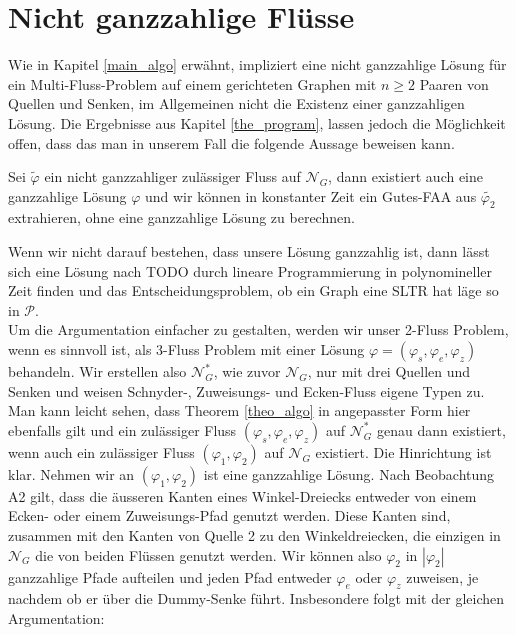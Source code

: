 \chapter{Nicht ganzzahlige Flüsse}

Wie in Kapitel \ref{main_algo} erwähnt, impliziert eine nicht ganzzahlige Lösung für ein Multi-Fluss-Problem auf einem gerichteten Graphen mit $n\geq 2$ Paaren von Quellen und Senken, im Allgemeinen nicht die Existenz einer ganzzahligen Lösung. Die Ergebnisse aus Kapitel \ref{the_program}, lassen jedoch die Möglichkeit offen, dass das man in unserem Fall die folgende Aussage beweisen kann.

\begin{conjecture}\label{int_conj}
Sei $\tilde{\varphi}$ ein nicht ganzzahliger zulässiger Fluss auf $\mathcal{N}_G$, dann existiert auch eine ganzzahlige Lösung $\varphi$ und wir können in konstanter Zeit ein Gutes-FAA aus $\tilde{\varphi_2}$ extrahieren, ohne eine ganzzahlige Lösung zu berechnen.
\end{conjecture}

Wenn wir nicht darauf bestehen, dass unsere Lösung ganzzahlig ist, dann lässt sich eine Lösung nach TODO durch lineare Programmierung in polynomineller Zeit finden und das Entscheidungsproblem, ob ein Graph eine SLTR hat läge so in $\mathcal{P}$. \\

Um die Argumentation einfacher zu gestalten, werden wir unser 2-Fluss Problem, wenn es sinnvoll ist, als 3-Fluss Problem mit einer Lösung $\varphi=(\varphi_s,\varphi_e,\varphi_z)$ behandeln. Wir erstellen also $\mathcal{N}_G^*$, wie zuvor $\mathcal{N}_G$, nur mit drei Quellen und Senken und weisen Schnyder-, Zuweisungs- und Ecken-Fluss eigene Typen zu. Man kann leicht sehen, dass Theorem \ref{theo_algo} in angepasster Form hier ebenfalls gilt und ein zulässiger  Fluss $(\varphi_s,\varphi_e,\varphi_z)$ auf $\mathcal{N}_G^*$ genau dann existiert, wenn auch ein zulässiger Fluss $(\varphi_1,\varphi_2)$ auf $\mathcal{N}_G$ existiert. Die Hinrichtung ist klar. Nehmen wir an $(\varphi_1,\varphi_2)$ ist eine ganzzahlige Lösung. Nach Beobachtung A2 gilt, dass die äusseren Kanten eines Winkel-Dreiecks entweder von einem Ecken- oder einem Zuweisungs-Pfad genutzt werden. Diese Kanten sind, zusammen mit den Kanten von Quelle 2 zu den Winkeldreiecken, die einzigen in $\mathcal{N}_G$ die von beiden Flüssen genutzt werden. Wir können also $\varphi_2$ in $|\varphi_2|$ ganzzahlige Pfade aufteilen und jeden Pfad entweder $\varphi_e$ oder $\varphi_z$ zuweisen, je nachdem ob er über die Dummy-Senke führt. Insbesondere folgt mit der gleichen Argumentation:  

